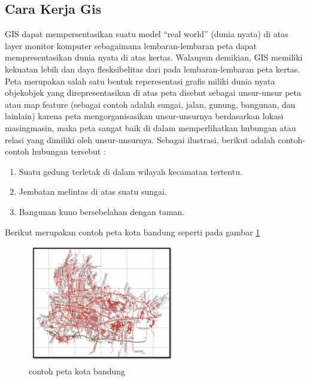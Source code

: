 \subsection{Cara Kerja Gis}
 GIS dapat mempersentasikan suatu model “real world” (dunia nyata) di atas layer monitor komputer sebagaimana lembaran-lembaran peta dapat mempresentasikan dunia nyata di atas kertas. Walaupun demikian, GIS memiliki kekuatan lebih dan daya flesksibelitas dari pada lembaran-lembaran peta kertas. Peta merupakan salah satu bentuk reperesentasi grafis miliki dunia nyata objekobjek yang direpresentasikan di atas peta disebut sebagai unsur-unsur peta atau map feature (sebagai contoh adalah sungai, jalan, gunung, bangunan, dan lainlain) karena peta mengorganisasikan unsur-unsurnya berdasarkan lokasi masingmasin, maka peta sangat baik di dalam memperlihatkan hubungan atau relasi yang dimiliki oleh unsur-unsurnya. Sebagai ilustrasi, berikut adalah contoh-contoh hubungan tersebut :
\begin{enumerate}
\item Suatu gedung terletak di dalam wilayah kecamatan tertentu.
\item Jembatan melintas di atas suatu sungai.
\item Bangunan kuno bersebelahan dengan taman.
\end{enumerate}
Berikut merupakan contoh peta kota bandung seperti pada gambar \ref{kotapetabandung}
\begin{figure}[ht]
	\centerline{\includegraphics[width=0.60\textwidth]{pictures/bnd.jpg}}
	\caption{contoh peta kota bandung}
	\label{kotapetabandung}
	\end{figure}

